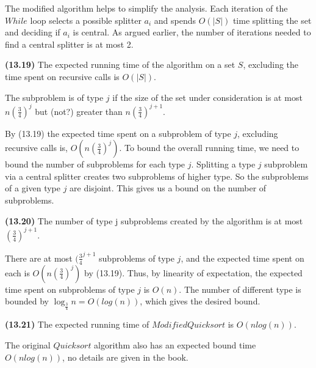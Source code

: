 \documentclass{proc}
\begin{document}
The modified algorithm helps to simplify the analysis. Each iteration of the $While$ loop selects a possible splitter $a_i$ and spends $O(|S|)$ time splitting the set and deciding if $a_i$ is central. As argued earlier, the number of iterations needed to find a central splitter is at most 2.

\begin{mdframed}
    \textbf{(13.19)} The expected running time of the algorithm on a set $S$, excluding the time spent on recursive calls is $O(|S|)$.
\end{mdframed}

The subproblem is of type $j$ if the size of the set under consideration is at most $n(\frac{3}{4})^j$ but (not?) greater than $n(\frac{3}{4})^{j+1}$.

By (13.19) the expected time spent on a subproblem of type $j$, excluding recursive calls is, $O(n(\frac{3}{4})^j)$. To bound the overall running time, we need to bound the number of subproblems for each type $j$. Splitting a type $j$ subproblem via a central splitter creates two subproblems of higher type. So the subproblems of a given type $j$ are disjoint. This gives us a bound on the number of subproblems.

\begin{mdframed}
    \textbf{(13.20)} The number of type j subproblems created by the algorithm is at most $(\frac{3}{4})^{j+1}$.
\end{mdframed}

There are at most $(\frac{3}{4}^{j+1}$ subproblems of type $j$, and the expected time spent on each is $O(n(\frac{3}{4})^j)$ by (13.19). Thus, by linearity of expectation, the expected time spent on subproblems of type $j$ is $O(n)$. The number of different type is bounded by $\log_{\frac{3}{4}}n = O(log(n))$, which gives the desired bound.

\begin{mdframed}
    \textbf{(13.21)} The expected running time of $Modified Quicksort$ is $O(nlog(n))$.
\end{mdframed}

The original $Quicksort$ algorithm also has an expected bound time $O(nlog(n))$, no details are given in the book.
\end{document}

